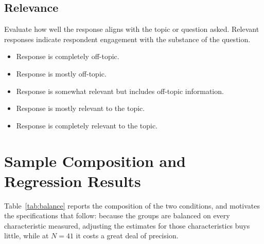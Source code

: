 \documentclass[12pt]{article}
\begin{document}
\subsection*{Relevance}

Evaluate how well the response aligns with the topic or question asked. Relevant responses indicate respondent engagement with the substance of the question.

\begin{itemize}
  \item[1:] Response is completely off-topic.
  \item[2:] Response is mostly off-topic.
  \item[3:] Response is somewhat relevant but includes off-topic
    information.
  \item[4:] Response is mostly relevant to the topic.
  \item[5:] Response is completely relevant to the topic.
\end{itemize}

\section{Sample Composition and Regression Results}
\label{app:regression}

Table~\ref{tab:balance} reports the composition of the two conditions, and motivates the specifications that follow: because the groups are balanced on every characteristic measured, adjusting the estimates for those characteristics buys little, while at $N = 41$ it costs a great deal of precision.
\end{document}
